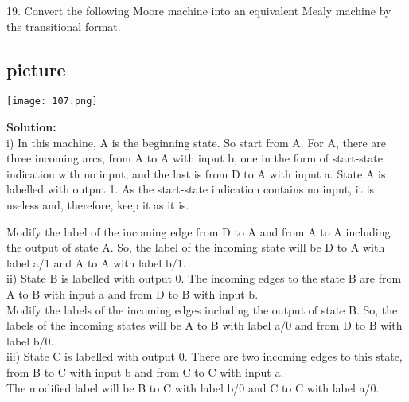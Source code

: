 \documentclass[8pt]{beamer}
\begin{document}
\begin{frame}
19. Convert the following Moore machine into an equivalent Mealy machine by the transitional
format.\\

\vspace*{0.1cm}
\begin{center}
\section{picture}
\texttt{[image: 107.png]}
\end{center}

\textbf{Solution:}\\
i) In this machine, A is the beginning state. So start from A. For A, there are three incoming
arcs, from A to A with input b, one in the form of start-state indication with no input, and the
last is from D to A with input a. State A is labelled with output 1. As the start-state indication
contains no input, it is useless and, therefore, keep it as it is.\\
\end{frame}


\begin{frame}
\hspace*{0.5cm} Modify the label of the incoming edge from D to A and from A to A including the output
of state A. So, the label of the incoming state will be D to A with label a/1 and A to A with
label b/1.\\

\vspace*{0.2cm}
ii) State B is labelled with output 0. The incoming edges to the state B are from A to B with input
a and from D to B with input b.\\
\hspace*{0.5cm} Modify the labels of the incoming edges including the output of state B. So, the labels of
the incoming states will be A to B with label a/0 and from D to B with label b/0.\\

\vspace*{0.2cm}
iii) State C is labelled with output 0. There are two incoming edges to this state, from B to C with
input b and from C to C with input a.\\
\hspace*{0.5cm} The modified label will be B to C with label b/0 and C to C with label a/0.\\
\end{frame}
\end{document}
